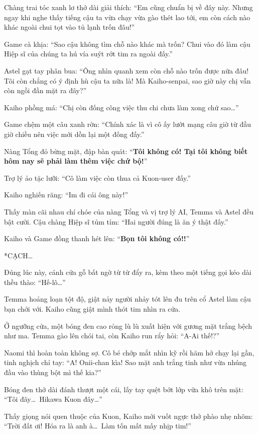 \documentclass[../main.tex]{subfiles}
\begin{document}
Chàng trai tóc xanh lơ thở dài giải thích: ``Em cũng chuẩn bị về đây này. Nhưng ngay khi nghe thấy tiếng cậu ta vừa chạy vừa gào thét lao tới, em còn cách nào khác ngoài chui tọt vào tủ lạnh trốn đâu!''

Game cà khịa: ``Sao cậu không tìm chỗ nào khác mà trốn? Chui vào đó làm cậu Hiệp sĩ của chúng ta hú vía suýt rớt tim ra ngoài đấy.''

Astel gạt tay phân bua: ``Ông nhìn quanh xem còn chỗ nào trốn được nữa đâu! Tôi còn chẳng có ý định hù cậu ta nữa là! Mà Kaiho-senpai, sao giờ này chị vẫn còn ngồi đần mặt ra đây?''

Kaiho phồng má: ``Chị còn đống công việc thu chi chưa làm xong chứ sao\dots''

Game chệm một câu xanh rờn: ``Chính xác là vì cô ấy lướt mạng câu giờ từ đầu giờ chiều nên việc mới dồn lại một đống đấy.''

Nàng Tổng đỏ bừng mặt, đập bàn quát: ``\textbf{Tôi không có! Tại tôi không biết hôm nay sẽ phải làm thêm việc chứ bộ!}''

Trợ lý ảo tặc lưỡi: ``Cô làm việc còn thua cả Kuon-user đấy.''

Kaiho nghiến răng: ``Im đi cái ông này!''

Thấy màn cãi nhau chí chóe của nàng Tổng và vị trợ lý AI, Temma và Astel đều bật cười. Cậu chàng Hiệp sĩ tủm tỉm: ``Hai người đúng là ăn ý thật đấy.''

Kaiho và Game đồng thanh hét lên: ``\textbf{Bọn tôi không có!!}''

*CẠCH\dots*

Đúng lúc này, cánh cửa gỗ bất ngờ từ từ đẩy ra, kèm theo một tiếng gọi kéo dài thều thào: ``Hế-lô\dots''

Temma hoảng loạn tột độ, giật nảy người nhảy tót lên đu trên cổ Astel làm cậu bạn chới với. Kaiho cũng giật mình thót tim nhìn ra cửa.

Ở ngưỡng cửa, một bóng đen cao rỏng lù lù xuất hiện với gương mặt trắng bệch như ma. Temma gào lên chói tai, còn Kaiho run rẩy hỏi: ``A-Ai thế!?''

Naomi thì hoàn toàn không sợ. Cô bé chớp mắt nhìn kỹ rồi hăm hở chạy lại gần, tinh nghịch chỉ tay: ``A! Onii-chan kìa! Sao mặt anh trắng tinh như vừa nhúng đầu vào thùng bột mì thế kia?''

Bóng đen thở dài đánh thượt một cái, lấy tay quệt bớt lớp vữa khô trên mặt: ``Tôi đây\dots\ Hikawa Kuon đây\dots''

Thấy giọng nói quen thuộc của Kuon, Kaiho mới vuốt ngực thở phào nhẹ nhõm: ``Trời đất ơi! Hóa ra là anh à\dots\ Làm tốn mất mấy nhịp tim!''
\end{document}
